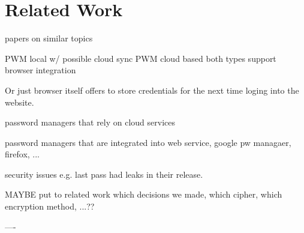 \section{Related Work}
\label{relwork}
papers on similar topics

PWM local w/ possible cloud sync
PWM cloud based 
both types support browser integration

Or just browser itself offers to store credentials for the next time loging into the website.

password managers that rely on cloud services

password managers that are integrated into web service, google pw managaer, firefox, ...

security issues e.g. last pass had leaks in their release.


MAYBE put to related work which decisions we made, which cipher, which encryption method, ...??


----
